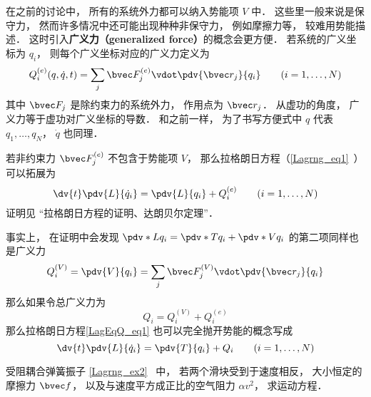 
\begin{issues}
\issueTODO
\end{issues}


在之前的讨论中， 所有的系统外力都可以纳入势能项 $V$ 中． 这些里一般来说是保守力， 然而许多情况中还可能出现种种非保守力， 例如摩擦力等， 较难用势能描述． 这时引入\textbf{广义力（generalized force）}的概念会更方便． 若系统的广义坐标为 $q_i$， 则每个广义坐标对应的广义力定义为
\begin{equation}
Q_i^{(e)}(q, \dot q, t) = \sum_j \bvec F_j^{(e)} \vdot \pdv{\bvec r_j}{q_i} \qquad (i=1,\dots,N)
\end{equation}
其中 $\bvec F_j$ 是除约束力的系统外力， 作用点为 $\bvec r_j$． 从虚功的角度， 广义力等于虚功对广义坐标的导数． 和之前一样， 为了书写方便式中 $q$ 代表 $q_1, \dots, q_N$， $\dot q$ 也同理．

若非约束力 $\bvec F_j^{(e)}$ 不包含于势能项 $V$， 那么拉格朗日方程（\autoref{Lagrng_eq1}~）可以拓展为
\begin{equation}\label{LagEqQ_eq1}
\dv{t} \pdv{L}{\dot q_i} = \pdv{L}{q_i} + Q_i^{(e)}
\qquad (i=1,\dots,N)
\end{equation}
证明见 “拉格朗日方程的证明、达朗贝尔定理”．

事实上， 在证明中会发现 $\pdv*{L}{q_i} = \pdv*{T}{q_i} + \pdv*{V}{q_i}$ 的第二项同样也是广义力
\begin{equation}
Q_i^{(V)} = \pdv{V}{q_i} = \sum_j \bvec F_j^{(V)} \vdot \pdv{\bvec r_j}{q_i}
\end{equation}
那么如果令总广义力为
\begin{equation}
Q_i = Q_i^{(V)} + Q_i^{(e)}
\end{equation}
那么拉格朗日方程\autoref{LagEqQ_eq1} 也可以完全抛开势能的概念写成
\begin{equation}\label{LagEqQ_eq2}
\dv{t} \pdv{L}{\dot q_i} = \pdv{T}{q_i} + Q_i
\qquad (i=1,\dots,N)
\end{equation}


\begin{example}{受阻耦合弹簧振子}
\autoref{Lagrng_ex2}~ 中， 若两个滑块受到于速度相反， 大小恒定的摩擦力 $\bvec f$， 以及与速度平方成正比的空气阻力 $\alpha v^2$， 求运动方程．
\end{example}
